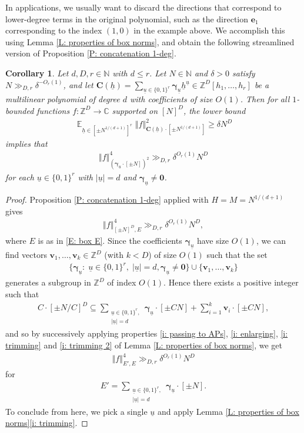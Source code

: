 \documentclass[11pt]{amsart}
\newtheorem{corollary}[lemma]{Corollary}
\theoremstyle{definition}
\DeclareMathOperator*{\E}{\mathbb{E}}
\newcommand{\C}{{\mathbb C}}
\newcommand{\N}{{\mathbb N}}
\newcommand{\Z}{{\mathbb Z}}
\newcommand{\bc}{{\textbf{C}}}
\newcommand{\be}{{\mathbf{e}}}
\newcommand{\bv}{{\textbf{v}}}
\newcommand{\bgamma}{{\boldsymbol{\gamma}}}
\newcommand{\uh}{{\underline{h}}}
\newcommand{\uu}{{\underline{u}}}
\newcommand{\norm}[1]{\left\Vert #1\right\Vert}
\begin{document}
In applications, we usually want to discard the directions that correspond to lower-degree terms in the original polynomial, such as the direction $\be_1$ corresponding to the index $(1,0)$ in the example above. We accomplish this using Lemma \ref{L: properties of box norms}, and obtain the following streamlined version of Proposition \ref{P: concatenation 1-deg}.
\begin{corollary}\label{C: concatenation 1-deg}
   Let $d, D, r\in\N$ with $d\leq r$. Let $N\in\N$ and $\delta>0$ satisfy $N\gg_{D, r}\delta^{-O_r(1)}$, and let $\bc(\uh)= \sum\limits_{\uu\in\{0,1\}^r}\bgamma_\uu \uh^\uu\in\Z^D[h_1, \ldots, h_{r}]$ be a multilinear polynomial of degree $d$ with coefficients of size $O(1)$.  Then for all $1$-bounded functions $f:\Z^D\to\C$ supported on $[N]^D$, the lower bound 
   \begin{align*}
        \E_{\uh\in[\pm N^{1/(d+1)}]^r}\norm{f}_{\bc(\uh)\cdot[\pm N^{1/(d+1)}]}^2\geq \delta N^D
   \end{align*}
   implies that
    \begin{align*}
        \norm{f}_{(\bgamma_\uu\cdot[\pm N])^2}^4\gg_{D, r} \delta^{O_{r}(1)}N^D
    \end{align*}
    for each $\uu\in\{0,1\}^r$ with $|\uu| = d$ {and $\bgamma_\uu \neq \textbf{0}$}.
\end{corollary}
\begin{proof}
Proposition \ref{P: concatenation 1-deg} applied with $H=M=N^{1/(d+1)}$ gives
    \begin{align*}
        \norm{f}_{[\pm N]^D, E}^4\gg_{D, r} \delta^{O_{r}(1)}N^D,
    \end{align*}
    where $E$ is as in \eqref{E: box E}. Since the coefficients $\bgamma_\uu$ have size $O(1)$, we can find vectors $\bv_1, \ldots, \bv_k\in\Z^D$ (with $k<D$) of size $O(1)$ such that the set
    \begin{align*}
        \{\bgamma_\uu:\; \uu\in\{0,1\}^r,\; |\uu|=d, \bgamma_\uu \neq \textbf{0}\}\cup \{\bv_1, \ldots, \bv_k\}
    \end{align*}
    generates a subgroup in $\Z^D$ of index $O(1)$. Hence there exists a positive integer 
    such that
    \begin{align*}
        C\cdot [\pm N/C]^D
        \subseteq \sum_{\substack{\uu\in\{0,1\}^r,\\ |\uu|=d}}\bgamma_\uu\cdot[\pm CN]+\sum_{i=1}^k \bv_i\cdot[\pm CN],
    \end{align*}
    and so by successively applying properties \eqref{i: passing to APs}, \eqref{i: enlarging}, \eqref{i: trimming} and \eqref{i: trimming 2} of Lemma \ref{L: properties of box norms}, we get
    \begin{align*}
        \norm{f}_{E', E}^4\gg_{D, r} \delta^{O_{r}(1)}N^D
    \end{align*}
    for 
    \begin{align*}
        E' = \sum_{\substack{\uu\in\{0,1\}^r,\\ |\uu|=d}}\bgamma_\uu\cdot[\pm N].
    \end{align*}
    To conclude from here, we pick a single $\uu$ and apply Lemma \ref{L: properties of box norms}\eqref{i: trimming}.  
\end{proof}
\end{document}
